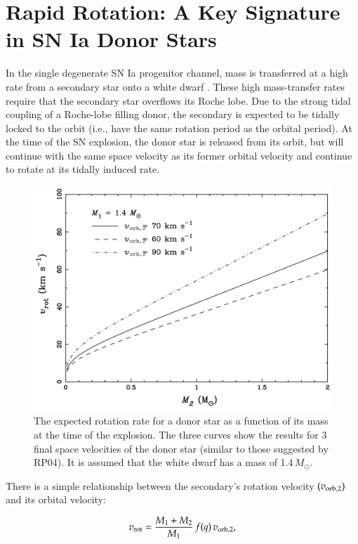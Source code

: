 \section{Rapid Rotation: A Key Signature in SN Ia Donor Stars}
\label{sec:rot}
In the single degenerate SN Ia progenitor channel, mass is transferred
at a high rate from a secondary star onto a white dwarf \citep{Nomoto:1982p451,Nomoto:2007p480}. These high
mass-transfer rates require that the secondary star overflows its
Roche lobe. Due to the strong tidal coupling of a Roche-lobe filling
donor, the secondary is expected to be tidally locked to the orbit
(i.e., have the same rotation period as the orbital period).  At the
time of the SN explosion, the donor star is released from its orbit, but
will continue with the same space velocity as its former orbital
velocity and continue to rotate at its tidally induced rate.

\begin{figure}[h!]
\centering
\includegraphics*[width=\textwidth]{chapter_sn1572_starg/plots/theo_rot_podsi.pdf}
\caption{The expected rotation rate for a donor star as a function of
its mass at the time of the explosion. The three curves show the results for 3 final space
velocities of the donor star (similar to those suggested by RP04). It
is assumed that the white dwarf has a mass of 1.4\,$M_\odot$.}
\label{fig:theorot}
\end{figure}

There is a simple relationship between the secondary's rotation
velocity $(v_{\rm orb, 2})$ and its orbital velocity:

$$ v_{\rm rot} = {M_1 + M_2\over M_1}\,f(q)\,v_{\rm orb, 2} ,$$

